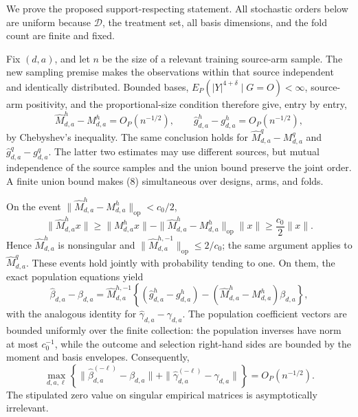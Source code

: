 We prove the proposed support-respecting statement.  All stochastic orders below are uniform because \(\mathcal D\), the treatment set, all basis dimensions, and the fold count are finite and fixed.

Fix \((d,a)\), and let \(n\) be the size of a relevant training source-arm sample.  The new sampling premise makes the observations within that source independent and identically distributed.  Bounded bases, \(E_P(|Y|^{4+\delta}\mid G=O)<\infty\), source-arm positivity, and the proportional-size condition therefore give, entry by entry,
\[
 \widehat M^h_{d,a}-M^h_{d,a}=O_P(n^{-1/2}),
 \qquad
 \widehat g^h_{d,a}-g^h_{d,a}=O_P(n^{-1/2}),                 \tag{8}
\]
by Chebyshev's inequality.  The same conclusion holds for \(\widehat M^q_{d,a}-M^q_{d,a}\) and \(\widehat g^q_{d,a}-g^q_{d,a}\).  The latter two estimates may use different sources, but mutual independence of the source samples and the union bound preserve the joint order.  A finite union bound makes (8) simultaneous over designs, arms, and folds.

On the event \(\|\widehat M^h_{d,a}-M^h_{d,a}\|_{\mathrm{op}}<c_0/2\),
\[
 \|\widehat M^h_{d,a}x\|
 \ge \|M^h_{d,a}x\|
      -\|\widehat M^h_{d,a}-M^h_{d,a}\|_{\mathrm{op}}\|x\|
 \ge \frac{c_0}{2}\|x\|.                                  \tag{9}
\]
Hence \(\widehat M^h_{d,a}\) is nonsingular and \(\|\widehat M^{h,-1}_{d,a}\|_{\mathrm{op}}\le2/c_0\); the same argument applies to \(\widehat M^q_{d,a}\).  These events hold jointly with probability tending to one.  On them, the exact population equations yield
\[
 \widehat\beta_{d,a}-\beta_{d,a}
 =\widehat M_{d,a}^{h,-1}
 \left\{(\widehat g^h_{d,a}-g^h_{d,a})
 -(\widehat M^h_{d,a}-M^h_{d,a})\beta_{d,a}\right\},       \tag{10}
\]
with the analogous identity for \(\widehat\gamma_{d,a}-\gamma_{d,a}\).  The population coefficient vectors are bounded uniformly over the finite collection: the population inverses have norm at most \(c_0^{-1}\), while the outcome and selection right-hand sides are bounded by the moment and basis envelopes.  Consequently,
\[
 \max_{d,a,\ell}\left\{
 \|\widehat\beta_{d,a}^{(-\ell)}-\beta_{d,a}\|
 +\|\widehat\gamma_{d,a}^{(-\ell)}-\gamma_{d,a}\|
 \right\}=O_P(n^{-1/2}).                                    \tag{11}
\]
The stipulated zero value on singular empirical matrices is asymptotically irrelevant.

